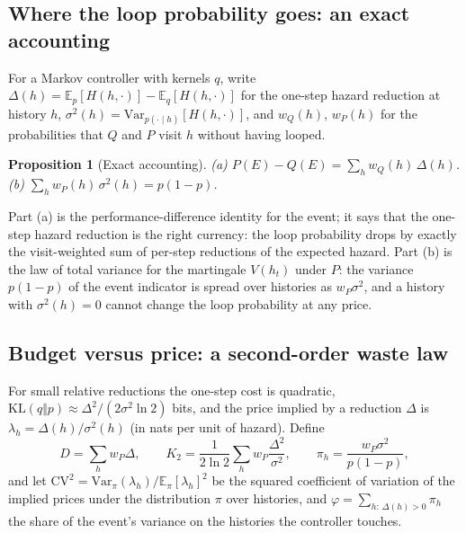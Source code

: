 \documentclass[make,article,submit,pdftex]{Definitions/mdpi}
\providecommand{\KL}{}\renewcommand{\KL}{\mathrm{KL}}
\providecommand{\E}{}\renewcommand{\E}{\mathbb{E}}
\newtheorem{prop}{Proposition}
\begin{document}
\subsection{Where the loop probability goes: an exact accounting}\label{ssec:accounting}
For a Markov controller with kernels $q$, write $\Delta(h)=\E_{p}[H(h,\cdot)]-\E_{q}[H(h,\cdot)]$ for the one-step hazard reduction at history $h$, $\sigma^2(h)=\mathrm{Var}_{p(\cdot\mid h)}[H(h,\cdot)]$, and $w_Q(h)$, $w_P(h)$ for the probabilities that $Q$ and $P$ visit $h$ without having looped.

\begin{prop}[Exact accounting]\label{prop:accounting}
(a) $P(E)-Q(E)=\sum_h w_Q(h)\,\Delta(h)$. (b) $\sum_h w_P(h)\,\sigma^2(h)=p(1-p)$.
\end{prop}
Part (a) is the performance-difference identity \cite{kakade2002approximately} for the event; it says that the one-step hazard reduction is the right currency: the loop probability drops by exactly the visit-weighted sum of per-step reductions of the expected hazard. Part (b) is the law of total variance for the martingale $V(h_t)$ under $P$: the variance $p(1-p)$ of the event indicator is spread over histories as $w_P\sigma^2$, and a history with $\sigma^2(h)=0$ cannot change the loop probability at any price.

\subsection{Budget versus price: a second-order waste law}\label{ssec:wastelaw}
For small relative reductions the one-step cost is quadratic, $\KL(q\Vert p)\approx \Delta^2/(2\sigma^2\ln 2)$ bits, and the price implied by a reduction $\Delta$ is $\lambda_h=\Delta(h)/\sigma^2(h)$ (in nats per unit of hazard). Define
\[
D=\sum_h w_P\Delta,\qquad K_2=\frac1{2\ln2}\sum_h w_P\frac{\Delta^2}{\sigma^2},\qquad \pi_h=\frac{w_P\sigma^2}{p(1-p)},
\]
and let $\mathrm{CV}^2=\mathrm{Var}_\pi(\lambda_h)/\E_\pi[\lambda_h]^2$ be the squared coefficient of variation of the implied prices under the distribution $\pi$ over histories, and $\varphi=\sum_{h:\,\Delta(h)>0}\pi_h$ the share of the event's variance on the histories the controller touches.
\end{document}
